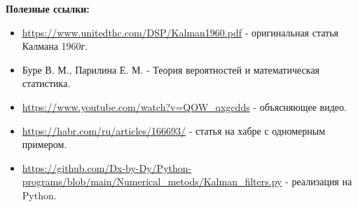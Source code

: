 \documentclass[12pt, a4paper]{article}
\begin{document}
\begin{flushleft}
\textbf{Полезные ссылки:}
\end{flushleft}

\begin{itemize}
\item \url{https://www.unitedthc.com/DSP/Kalman1960.pdf} - оригинальная статья Калмана 1960г.
\item Буре В. М., Парилина Е. М. - Теория вероятностей и математическая статистика.
\item \url{https://www.youtube.com/watch?v=QOW_qxgcdds} - объясняющее видео.
\item \url{https://habr.com/ru/articles/166693/} - статья на хабре с одномерным примером.
\item \url{https://github.com/Dx-by-Dy/Python-programs/blob/main/Numerical_metods/Kalman_filters.py} - реализация на Python.
\end{itemize}
\end{document}
